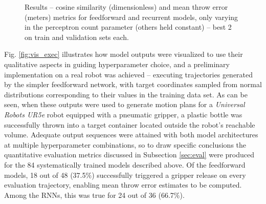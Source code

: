 \documentclass{article}
\begin{document}
\begin{figure}[!t]
	\centering
	\caption{Results -- cosine similarity (dimensionless) and mean throw error (meters) metrics for feedforward and recurrent models, only varying in the perceptron count parameter (others held constant) -- best 2 on train and validation sets each.}
	\label{fig:ind_rnn_naive}
\end{figure}

Fig. \ref{fig:vis_exec} illustrates how model outputs were visualized to use their qualitative aspects in guiding hyperparameter choice, and a preliminary implementation on a real robot was achieved -- executing trajectories generated by the simpler feedforward network, with target coordinates sampled from normal distributions corresponding to their values in the training data set. As can be seen, when these outputs were used to generate motion plans for a \emph{Universal Robots UR5e} robot equipped with a pneumatic gripper, a plastic bottle was successfully thrown into a target container located outside the robot's reachable volume. Adequate output sequences were attained with both model architectures at multiple hyperparameter combinations, so to draw specific conclusions the quantitative evaluation metrics discussed in Subsection \ref{sec:eval} were produced for the 84 systematically trained models described above. Of the feedforward models, 18 out of 48 (37.5\%) successfully triggered a gripper release on every evaluation trajectory, enabling mean throw error estimates to be computed. Among the RNNs, this was true for 24 out of 36 (66.7\%).
\end{document}
